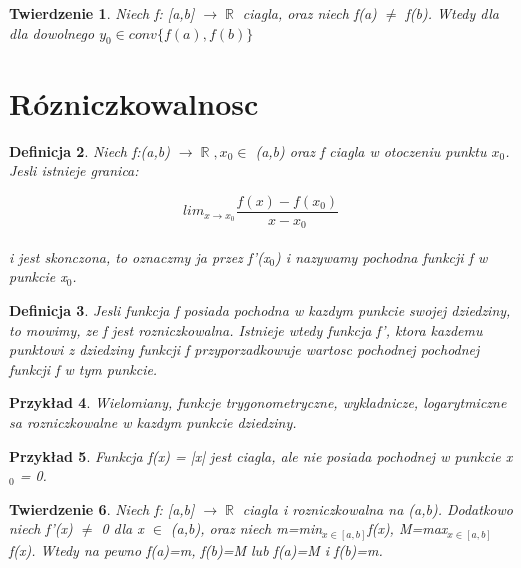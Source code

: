 \documentclass[11pt,a4paper]{article}
\newtheorem{tw}{Twierdzenie}[section]
\newtheorem{df}[tw]{Definicja}
\newtheorem{ex}[tw]{Przykład}
\DeclareMathOperator{\R}{\mathbb{R}}
\begin{document}
\begin{tw}
Niech f: [a,b] $\rightarrow \R$ ciagla, oraz niech f(a) $\not=$ f(b). Wtedy dla dla dowolnego $y_{0} \in conv\{f(a), 
f(b)\}$

\end{tw}


\section{Rózniczkowalnosc}

\begin{df}
Niech f:(a,b) $\to \R, x_{0} \in$ (a,b) oraz f ciagla w otoczeniu punktu $x_{0}$. Jesli istnieje granica:  

\[lim_{x \to x_{0}} \frac{f(x)-f(x_{0})}{x-x_{0}}\]
\\
i jest skonczona, to oznaczmy ja przez f'(x$_{0}$) i nazywamy pochodna funkcji f w punkcie x$_{0}$.
\end{df}

\begin{df}
Jesli funkcja f posiada pochodna w kazdym punkcie swojej dziedziny,
to mowimy, ze f jest rozniczkowalna. Istnieje wtedy funkcja f', ktora kazdemu
punktowi z dziedziny funkcji f przyporzadkowuje wartosc pochodnej pochodnej
funkcji f w tym punkcie.
\end{df}

\begin{ex}
Wielomiany, funkcje trygonometryczne, wykladnicze, logarytmiczne
sa rozniczkowalne w kazdym punkcie dziedziny.
\end{ex}

\begin{ex}
Funkcja f(x) = |x| jest ciagla, ale nie posiada pochodnej w punkcie x$_{0}$ = 0.
\end{ex}

\begin{tw}
Niech f: [a,b] $\to \R$ ciagla i rozniczkowalna na (a,b). Dodatkowo niech f'(x) $\not=$ 0 dla x $\in$ (a,b), oraz 
niech m=min$_{x\in[a,b]}$f(x), M=max$_{x\in[a,b]}$f(x).
Wtedy na pewno f(a)=m, f(b)=M lub f(a)=M i f(b)=m. 

\end{tw}
\end{document}
